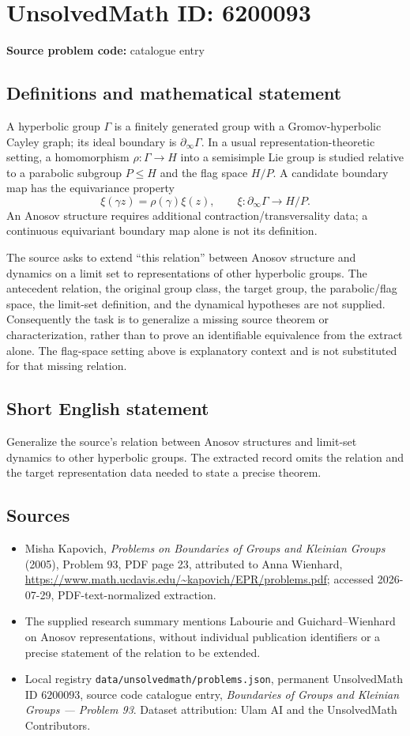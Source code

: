 \documentclass[11pt]{article}
\begin{document}
\section*{UnsolvedMath ID: 6200093}
\textbf{Source problem code:} catalogue entry
\subsection{Definitions and mathematical statement}
A hyperbolic group $\Gamma$ is a finitely generated group with a Gromov-hyperbolic Cayley graph; its ideal boundary is $\partial_\infty\Gamma$. In a usual representation-theoretic setting, a homomorphism $\rho:\Gamma\to H$ into a semisimple Lie group is studied relative to a parabolic subgroup $P\leq H$ and the flag space $H/P$. A candidate boundary map has the equivariance property
\[
\xi(\gamma z)=\rho(\gamma)\xi(z),\qquad
\xi:\partial_\infty\Gamma\to H/P.
\]
An Anosov structure requires additional contraction/transversality data; a continuous equivariant boundary map alone is not its definition.

The source asks to extend ``this relation'' between Anosov structure and dynamics on a limit set to representations of other hyperbolic groups. The antecedent relation, the original group class, the target group, the parabolic/flag space, the limit-set definition, and the dynamical hypotheses are not supplied. Consequently the task is to generalize a missing source theorem or characterization, rather than to prove an identifiable equivalence from the extract alone. The flag-space setting above is explanatory context and is not substituted for that missing relation.
\subsection{Short English statement}
Generalize the source's relation between Anosov structures and limit-set dynamics to other hyperbolic groups. The extracted record omits the relation and the target representation data needed to state a precise theorem.
\subsection{Sources}
\begin{itemize}
\item Misha Kapovich, \emph{Problems on Boundaries of Groups and Kleinian Groups} (2005), Problem 93, PDF page 23, attributed to Anna Wienhard, \url{https://www.math.ucdavis.edu/~kapovich/EPR/problems.pdf}; accessed 2026-07-29, PDF-text-normalized extraction.
\item The supplied research summary mentions Labourie and Guichard--Wienhard on Anosov representations, without individual publication identifiers or a precise statement of the relation to be extended.
\item Local registry \texttt{data/unsolvedmath/problems.json}, permanent UnsolvedMath ID $6200093$, source code catalogue entry, \emph{Boundaries of Groups and Kleinian Groups --- Problem 93}. Dataset attribution: Ulam AI and the UnsolvedMath Contributors.
\end{itemize}
\end{document}
